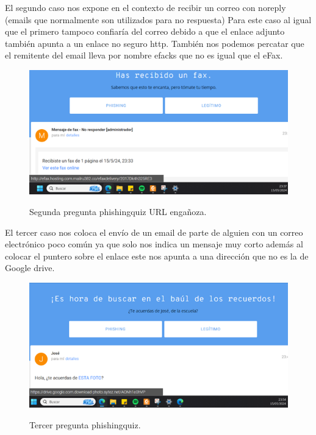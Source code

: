 \documentclass[stu, 11pt, letterpaper, donotrepeattitle, floatsintext, natbib]{apa7}
\begin{document}
El segundo caso nos expone en el contexto de recibir un correo con noreply (emails que normalmente son utilizados para no respuesta) Para este caso al igual que el primero tampoco confiaría del correo debido a que el enlace adjunto también apunta a un enlace no seguro http. También nos podemos percatar que el remitente del email lleva por nombre efacks que no es igual que el eFax.

\begin{figure}[H]
    \centering
    \caption{Segunda pregunta phishingquiz URL engañoza.}
    \includegraphics[width=0.75\linewidth]{phishing5.png} %
    \label{fig:OverallEffect}
\end{figure}

El tercer caso nos coloca el envío de un email de parte de alguien con un correo electrónico poco común ya que solo nos indica un mensaje muy corto además al colocar el puntero sobre el enlace este nos apunta a una dirección que no es la de Google drive.

\begin{figure}[H]
    \centering
    \caption{Tercer pregunta phishingquiz.}
    \includegraphics[width=0.75\linewidth]{phishing6.png} %
    \label{fig:OverallEffect}
\end{figure}
\end{document}
